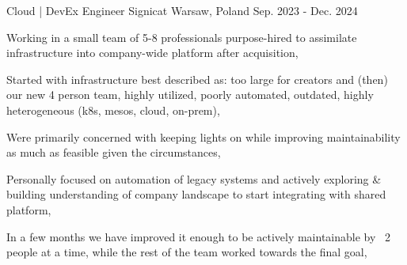 

\begin{cventries}

    \cventry
    {Cloud | DevEx Engineer} %
    {Signicat} %
    {Warsaw, Poland} %
    {Sep. 2023 - Dec. 2024} %
    {
        \begin{cvitems} %
            \item {Working in a small team of 5-8 professionals purpose-hired to assimilate infrastructure into company-wide platform after acquisition,}
            \item {Started with infrastructure best described as: too large for creators and (then) our new 4 person team, highly utilized, poorly automated, outdated, highly heterogeneous (k8s, mesos, cloud, on-prem),}
            \item {Were primarily concerned with keeping lights on while improving maintainability as much as feasible given the circumstances,}
            \item {Personally focused on automation of legacy systems and actively exploring \& building understanding of company landscape to start integrating with shared platform,}
            \item {In a few months we have improved it enough to be actively maintainable by ~2 people at a time, while the rest of the team worked towards the final goal,}
        \end{cvitems}
    }


\end{cventries}
